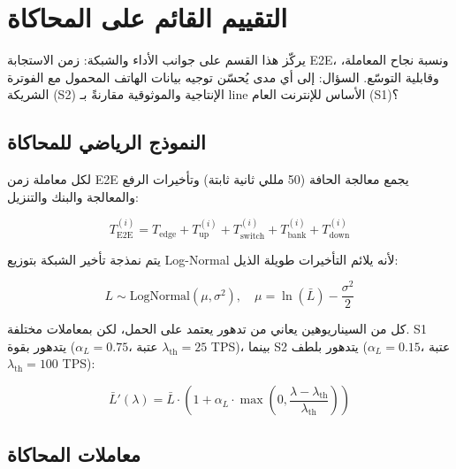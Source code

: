 \documentclass[12pt,a4paper]{article}
\begin{document}
\section{التقييم القائم على المحاكاة}
يركّز هذا القسم على جوانب الأداء والشبكة: زمن الاستجابة E2E، ونسبة نجاح المعاملة، وقابلية التوسّع. السؤال: إلى أي مدى يُحسّن توجيه بيانات الهاتف المحمول مع الفوترة الشريكة (S2) الإنتاجية والموثوقية مقارنةً بـ line الأساس للإنترنت العام (S1)؟

\subsection{النموذج الرياضي للمحاكاة}
لكل معاملة زمن E2E يجمع معالجة الحافة (50 مللي ثانية ثابتة) وتأخيرات الرفع والمعالجة والبنك والتنزيل:

\begin{equation}
T^{(i)}_{\mathrm{E2E}} = T_{\mathrm{edge}} + T^{(i)}_{\mathrm{up}} + T^{(i)}_{\mathrm{switch}} + T^{(i)}_{\mathrm{bank}} + T^{(i)}_{\mathrm{down}}
\label{eq:e2e}
\end{equation}

يتم نمذجة تأخير الشبكة بتوزيع Log-Normal لأنه يلائم التأخيرات طويلة الذيل:

\begin{equation}
L \sim \mathrm{LogNormal}(\mu, \sigma^2), \quad \mu = \ln(\bar{L}) - \frac{\sigma^2}{2}
\label{eq:lognormal}
\end{equation}

كل من السيناريوهين يعاني من تدهور يعتمد على الحمل، لكن بمعاملات مختلفة. S1 يتدهور بقوة ($\alpha_L = 0.75$، عتبة $\lambda_{\mathrm{th}} = 25$ TPS)، بينما S2 يتدهور بلطف ($\alpha_L = 0.15$، عتبة $\lambda_{\mathrm{th}} = 100$ TPS):

\begin{equation}
\bar{L}'(\lambda) = \bar{L} \cdot \left(1 + \alpha_L \cdot \max\left(0, \frac{\lambda - \lambda_{\mathrm{th}}}{\lambda_{\mathrm{th}}}\right)\right)
\label{eq:degradation}
\end{equation}

\subsection{معاملات المحاكاة}
\end{document}
